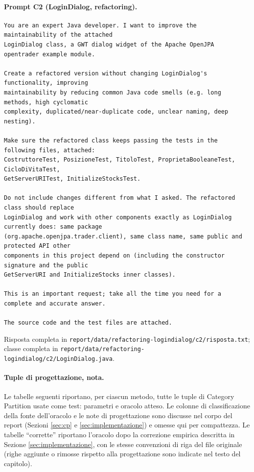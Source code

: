 \paragraph*{Prompt C2 (LoginDialog, refactoring).}
\label{prompt:refactor-ld-c2}
\begin{lstlisting}
You are an expert Java developer. I want to improve the maintainability of the attached
LoginDialog class, a GWT dialog widget of the Apache OpenJPA opentrader example module.

Create a refactored version without changing LoginDialog's functionality, improving
maintainability by reducing common Java code smells (e.g. long methods, high cyclomatic
complexity, duplicated/near-duplicate code, unclear naming, deep nesting).

Make sure the refactored class keeps passing the tests in the following files, attached:
CostruttoreTest, PosizioneTest, TitoloTest, ProprietaBooleaneTest, CicloDiVitaTest,
GetServerURITest, InitializeStocksTest.

Do not include changes different from what I asked. The refactored class should replace
LoginDialog and work with other components exactly as LoginDialog currently does: same package
(org.apache.openjpa.trader.client), same class name, same public and protected API other
components in this project depend on (including the constructor signature and the public
GetServerURI and InitializeStocks inner classes).

This is an important request; take all the time you need for a complete and accurate answer.

The source code and the test files are attached.
\end{lstlisting}
Risposta completa in \texttt{report/data/refactoring-logindialog/c2/risposta.txt}; classe
completa in \texttt{report/data/refactoring-logindialog/c2/LoginDialog.java}.

\paragraph*{Tuple di progettazione, nota.}
Le tabelle seguenti riportano, per ciascun metodo, tutte le tuple di Category Partition usate come test: parametri e oracolo atteso. Le colonne di classificazione della fonte dell'oracolo e le note di progettazione sono discusse nel corpo del report (Sezioni \ref{sec:cp} e \ref{sec:implementazione}) e omesse qui per compattezza. Le tabelle ``corrette'' riportano l'oracolo dopo la correzione empirica descritta in Sezione \ref{sec:implementazione}, con le stesse convenzioni di riga del file originale (righe aggiunte o rimosse rispetto alla progettazione sono indicate nel testo del capitolo).

